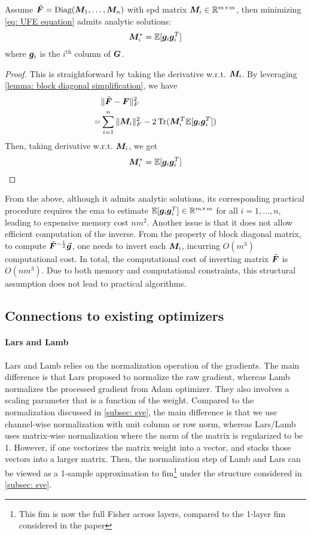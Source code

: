 \begin{proposition}
    Assume $\tilde{\bm{F}}=\operatorname{Diag}({\bm{M}}_1,\ldots, {\bm{M}}_n)$ with \gls{spd} matrix ${\bm{M}}_i\in\mathbb{R}^{m\times m}$, then minimizing \cref{eq: UFE equation} admits analytic solutions:
    \begin{align}
        {\bm{M}}_i^* = \mathbb{E}[{\bm{g}}_i{\bm{g}}_i^T]
        \label{eq: optimal general block diagonal}
    \end{align}
where ${\bm{g}}_i$ is the $i^{\text{th}}$ column of ${\bm{G}}$.
\end{proposition}
\begin{proof}
    This is straightforward by taking the derivative w.r.t. ${\bm{M}}_i$. By leveraging \cref{lemma: block diagonal simplification}, we have
    \begin{align*}
        &\Vert\tilde{\bm{F}}-{\bm{F}}\Vert_F^2\\
        =&\sum_{i=1}^n \Vert{\bm{M}}_i\Vert_F^2 - 2\operatorname{Tr}({\bm{M}}_i^T\mathbb{E}[{\bm{g}}_i{\bm{g}}_i^T])
    \end{align*}
    Then, taking derivative w.r.t. ${\bm{M}}_i$, we get 
    \begin{align*}
        {\bm{M}}_i^* = \mathbb{E}[{\bm{g}}_i{\bm{g}}_i^T]
    \end{align*}
\end{proof}
From the above, although it admits analytic solutions, its corresponding practical procedure requires the \gls{ema} to estimate $\mathbb{E}[{\bm{g}}_i{\bm{g}}_i^T]\in\mathbb{R}^{m\times m}$ for all $i=1,\ldots, n$, leading to expensive memory cost $nm^2$. Another issue is that it does not allow efficient computation of the inverse. From the property of block diagonal matrix, to compute $\tilde{\bm{F}}^{-\frac{1}{2}}\vec{\bm{g}}$, one needs to invert each ${\bm{M}}_i$, incurring $O(m^3)$ computational cost. In total, the computational cost of inverting matrix $\tilde{\bm{F}}$ is $O(nm^3)$. Due to both memory and computational constraints, this structural assumption does not lead to practical algorithms. 


\subsection{Connections to existing optimizers}
\label{subapp: connection to existing optimizers}
\paragraph{Lars and Lamb}
Lars and Lamb \citep{you2017lars, you2019lamb} relies on the normalization operation of the gradients. The main difference is that Lars proposed to normalize the raw gradient, whereas Lamb normalizes the processed gradient from Adam optimizer. They also involves a scaling parameter that is a function of the weight. Compared to the normalization discussed in \cref{subsec: sve}, the main difference is that we use channel-wise normalization with unit column or row norm, whereas Lars/Lamb uses matrix-wise normalization where the norm of the matrix is regularized to be 1. However, if one vectorizes the matrix weight into a vector, and stacks those vectors into a larger matrix. Then, the normalization step of Lamb and Lars can be viewed as a 1-sample approximation to \gls{fim}\footnote{This \gls{fim} is now the full Fisher across layers, compared to the 1-layer \gls{fim} considered in the paper} under the structure considered in \cref{subsec: sve}. 

